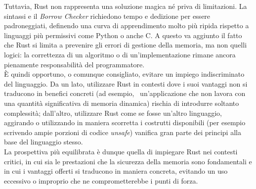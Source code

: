 Tuttavia, Rust non rappresenta una soluzione magica né priva di limitazioni. La sintassi e il \textit{Borrow Checker} richiedono tempo e dedizione per essere
padroneggiati, definendo una curva di apprendimento molto più ripida rispetto a linguaggi più permissivi come Python o anche C. A questo va aggiunto il fatto 
che Rust si limita a prevenire gli errori di gestione della memoria, ma non quelli logici: la correttezza di un algoritmo o di un'implementazione 
rimane ancora pienamente responsabilità del programmatore. \hfill 
\vspace{10pt}\\
\noindent È quindi opportuno, o comunque consigliato, evitare un impiego indiscriminato del linguaggio. Da un lato, utilizzare Rust in contesti 
dove i suoi vantaggi non si traducono in benefici concreti 
(ad esempio, \  un'applicazione che non lavora con una quantità significativa di memoria dinamica)
rischia di introdurre soltanto complessità;
dall'altro, utilizzare Rust come se fosse un'altro linguaggio, aggirando o utilizzando in maniera scorretta i costrutti 
disponibili (per esempio scrivendo ampie porzioni di codice \textit{unsafe}) vanifica gran parte dei 
principi alla base del linguaggio stesso. \hfill 
\vspace{10pt}\\
\noindent La prospettiva più equilibrata è dunque quella di impiegare Rust nei contesti critici, in cui sia le prestazioni che la sicurezza della memoria sono 
fondamentali e in cui i vantaggi offerti si traducono in maniera concreta, evitando un uso eccessivo o improprio che ne comprometterebbe i punti di forza.